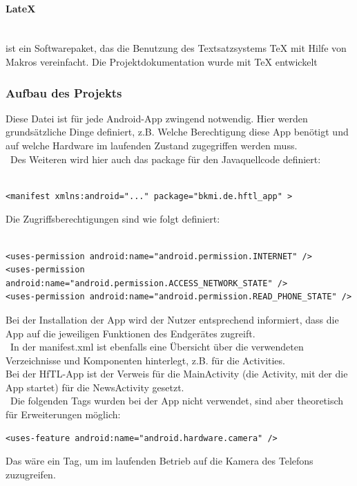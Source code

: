 \paragraph{LateX}
\ \\[1em]
ist ein Softwarepaket, das die Benutzung des Textsatzsystems TeX mit Hilfe von Makros vereinfacht. 
Die Projektdokumentation wurde mit TeX entwickelt 

\newpage

\subsubsection{Aufbau des Projekts}
Diese Datei ist für jede Android-App zwingend notwendig. Hier werden grundsätzliche Dinge definiert, z.B. Welche Berechtigung diese App benötigt und auf welche Hardware im laufenden Zustand zugegriffen werden muss.
\\\
Des Weiteren wird hier auch das package für den Javaquellcode definiert:\\\
\lstset{language=XML}
\begin{lstlisting}[caption={AndroidManifest.XML},label=package, frame=single]
<manifest xmlns:android="..." package="bkmi.de.hftl_app" >
\end{lstlisting}
Die Zugriffsberechtigungen sind wie folgt definiert:\\\

\begin{lstlisting}[caption={AndroidManifest.XML},label=permissions, frame=single]
<uses-permission android:name="android.permission.INTERNET" />
<uses-permission android:name="android.permission.ACCESS_NETWORK_STATE" />
<uses-permission android:name="android.permission.READ_PHONE_STATE" />
\end{lstlisting}
Bei der Installation der App wird der Nutzer entsprechend informiert, dass die App auf die jeweiligen Funktionen des Endgerätes zugreift.
 \\\
In der manifest.xml ist ebenfalls eine Übersicht über die verwendeten Verzeichnisse und Komponenten hinterlegt, z.B. für die Activities.\\
Bei der HfTL-App ist der Verweis für die MainActivity (die Activity, mit der die App startet) für die NewsActivity gesetzt.
 \\\ 
Die folgenden Tags wurden bei der App nicht verwendet, sind aber theoretisch für Erweiterungen möglich:
\begin{lstlisting}[caption={Zugriffsbeispiel},label=perm-examble, frame=single]
<uses-feature android:name="android.hardware.camera" />
\end{lstlisting}
Das wäre ein Tag, um im laufenden Betrieb auf die Kamera des Telefons zuzugreifen.

